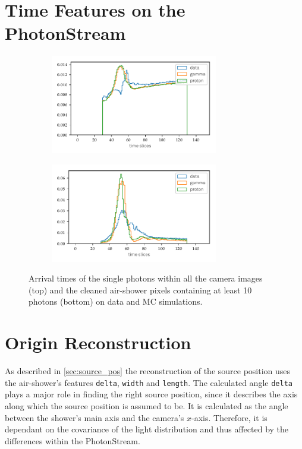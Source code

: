 \section{Time Features on the PhotonStream}
%
\begin{figure}
  \begin{subfigure}{\textwidth}
    \centering
    \includegraphics[width=0.8\textwidth]{Plots/all_slices_min_0_per_pixel.pdf}
  \end{subfigure}
  \begin{subfigure}{\textwidth}
    \centering
    \includegraphics[width=0.8\textwidth]{Plots/all_slices_min_10_per_pixel.pdf}
  \end{subfigure}
  \caption{Arrival times of the single photons within all the camera images (top) and the cleaned air-shower pixels containing at least 10 photons (bottom) on data and MC simulations.}
  \label{fig:slices}
\end{figure}

\section{Origin Reconstruction}
%
As described in \autoref{sec:source_pos} the reconstruction of the source
position uses the air-shower's features \texttt{delta}, \texttt{width} and
\texttt{length}. The calculated angle \texttt{delta} plays a major role in
finding the right source position, since it describes the axis along which
the source position is assumed to be. It is calculated as the angle between
the shower's main axis and the camera's $x$-axis. Therefore, it is dependant
on the covariance of the light distribution and thus affected by the
differences within the PhotonStream.

